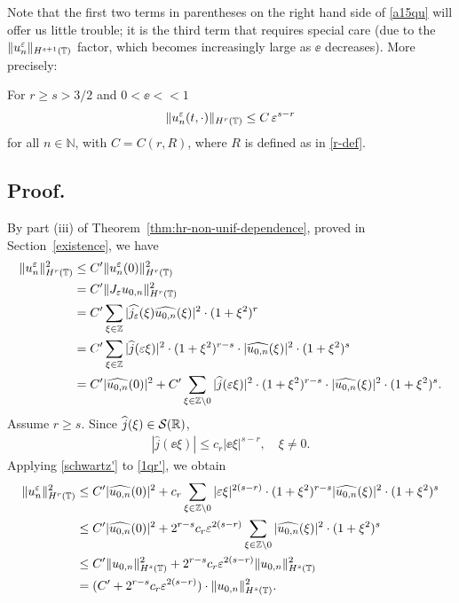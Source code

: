 Note that the first two terms in parentheses on the right hand side
of \eqref{a15qu} will offer us little trouble;
it is the third term that requires special care (due to the
$\|u^\varepsilon_n\|_{H^{s+1}(\mathbb{T})}$ factor, which becomes increasingly large as
$\ee$ decreases). More precisely:
%
%
%
\begin{remark}
\label{lem5r'}
For $r \ge s > 3/2$ and $0 < \ee <<1$ 
\begin{equation}
\begin{split}
\|u^\varepsilon_n (t, \cdot) \|_{H^r(\mathbb{T})} \le C \, \varepsilon^{s-r}
\label{700r'}
\end{split}
\end{equation}
for all $n \in \mathbb{N}$, with $C = C(r, R)$, where $R$ is defined as
in \eqref{r-def}.
\end{remark}
\subsection{Proof.} By part (iii) of Theorem~\ref{thm:hr-non-unif-dependence}, proved in Section~\ref{existence}, we have
\begin{equation}
\begin{split}
\|u^\varepsilon_n \|_{H^r(\mathbb{T})}^2
& \le C' \|u^\varepsilon_n (0)\|_{H^r(\mathbb{T})}^2
\\
& = C' \|J_\varepsilon u_{0,n}\|_{H^r(\mathbb{T})}^2
\\
& = C' \sum_{\xi \in \mathbb{Z}} |\widehat{j_\varepsilon} (\xi) \widehat{u_{0,n}}(\xi)
|^2 \cdot (1 + \xi^2)^r
\\
& = C' \sum_{\xi \in \mathbb{Z}} |\widehat{j }(\varepsilon \xi)|^2 \cdot (1 +
\xi^2)^{r-s} \cdot |\widehat{u_{0,n}}(\xi)|^2 \cdot (1 + \xi^2)^s
\\
& = C'|\widehat{u_{0,n}}(0)|^2 +
C' \sum_{\xi \in \mathbb{Z} \setminus {0}} |\widehat{j }(\varepsilon \xi)|^2 \cdot (1 +
\xi^2)^{r-s} \cdot |\widehat{u_{0,n}}(\xi)|^2 \cdot (1 + \xi^2)^s.
\label{1qr'}
\end{split}
\end{equation}
Assume $r \ge s$. Since $\widehat{j }(\xi) \in \mathcal{S}(\mathbb{R})$, 
\begin{equation}
\label{schwartz'}
\begin{split}
|\widehat{j }(\ee \xi)| \le c_r |\ee \xi |^{s-r}, \quad \xi \neq 0.
\end{split}
\end{equation}
Applying \eqref{schwartz'} to \eqref{1qr'}, we obtain
\begin{equation}
\label{calc_ue'}
\begin{split}
\|u^\varepsilon_n \|_{H^r(\mathbb{T})}^2 
& \le C' |\widehat{u_{0,n}}(0) |^2 + c_r \sum_{\xi \in \mathbb{Z} \setminus
{0}} |\varepsilon \xi |^{2(s-r)} \cdot (1 + \xi^2)^{r-s}
|\widehat{u_{0,n}}(\xi) |^2 \cdot (1 + \xi^2)^s
\\
& \le C' |\widehat{u_{0,n}}(0) |^2 + 2^{r-s} c_r \varepsilon^{2(s-r)}
\sum_{\xi \in \mathbb{Z} \setminus {0}} |\widehat{u_{0,n}}(\xi)|^2 \cdot (1 +
\xi^2)^s
\\
& \le C' \|u_{0,n}\|_{H^s(\mathbb{T})}^2 + 2^{r-s} c_r \varepsilon^{2(s-r)}
\|u_{0,n}\|_{H^s(\mathbb{T})}^2
\\
& = (C' + 2^{r-s} c_r \varepsilon^{2(s-r)}) \cdot \|u_{0,n}\|^2_{H^s(\mathbb{T})}.
\end{split}
\end{equation}
